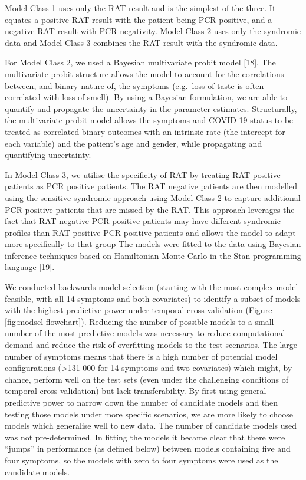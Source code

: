 \documentclass[]{elsarticle} %
\begin{document}
Model Class 1 uses only the RAT result and is the simplest of the three.
It equates a positive RAT result with the patient being PCR positive, and a negative RAT result with PCR negativity.
Model Class 2 uses only the syndromic data and Model Class 3 combines the RAT result with the syndromic data.

For Model Class 2, we used a Bayesian multivariate probit model {[}18{]}.
The multivariate probit structure allows the model to account for the correlations between, and binary nature of, the symptoms (e.g.~loss of taste is often correlated with loss of smell).
By using a Bayesian formulation, we are able to quantify and propagate the uncertainty in the parameter estimates.
Structurally, the multivariate probit model allows the symptoms and COVID-19 status to be treated as correlated binary outcomes with an intrinsic rate (the intercept for each variable) and the patient's age and gender, while propagating and quantifying uncertainty.

In Model Class 3, we utilise the specificity of RAT by treating RAT positive patients as PCR positive patients.
The RAT negative patients are then modelled using the sensitive syndromic approach using Model Class 2 to capture additional PCR-positive patients that are missed by the RAT.
This approach leverages the fact that RAT-negative-PCR-positive patients may have different syndromic profiles than RAT-positive-PCR-positive patients and allows the model to adapt more specifically to that group
The models were fitted to the data using Bayesian inference techniques based on Hamiltonian Monte Carlo in the Stan programming language {[}19{]}.

We conducted backwards model selection (starting with the most complex model feasible, with all 14 symptoms and both covariates) to identify a subset of models with the highest predictive power under temporal cross-validation (Figure \ref{fig:modsel-flowchart}).
Reducing the number of possible models to a small number of the most predictive models was necessary to reduce computational demand and reduce the risk of overfitting models to the test scenarios.
The large number of symptoms means that there is a high number of potential model configurations (\textgreater131 000 for 14 symptoms and two covariates) which might, by chance, perform well on the test sets (even under the challenging conditions of temporal cross-validation) but lack transferability.
By first using general predictive power to narrow down the number of candidate models and then testing those models under more specific scenarios, we are more likely to choose models which generalise well to new data.
The number of candidate models used was not pre-determined.
In fitting the models it became clear that there were ``jumps'' in performance (as defined below) between models containing five and four symptoms, so the models with zero to four symptoms were used as the candidate models.
\end{document}
